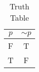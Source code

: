 \begin{table}[ht]
\caption{Truth Table}
\centering
\begin{tabular}{|c||c|}
\hline
$ p $ & $  \sim p $ \\
\hline
F & T \\
T & F \\
\hline
\end{tabular}
\label{table:tt1}
\end{table}
